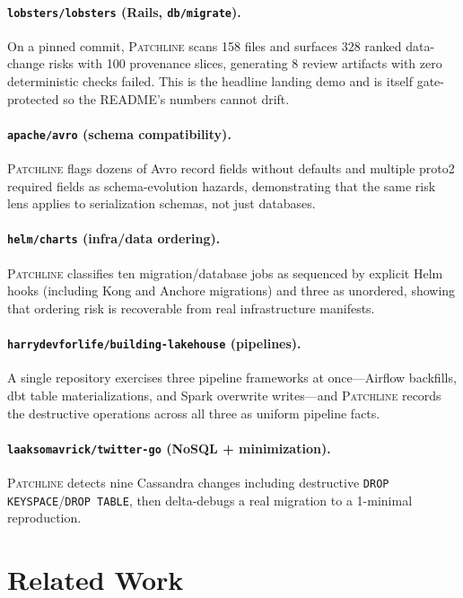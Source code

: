 \documentclass[11pt]{article}
\newcommand{\tool}{\textsc{Patchline}}
\newcommand{\code}[1]{\texttt{#1}}
\begin{document}
\paragraph{\code{lobsters/lobsters} (Rails, \code{db/migrate}).} On a pinned commit, \tool{} scans 158
files and surfaces 328 ranked data-change risks with 100 provenance slices, generating 8 review
artifacts with zero deterministic checks failed. This is the headline landing demo and is itself
gate-protected so the README's numbers cannot drift.

\paragraph{\code{apache/avro} (schema compatibility).} \tool{} flags dozens of Avro record fields
without defaults and multiple proto2 required fields as schema-evolution hazards, demonstrating that
the same risk lens applies to serialization schemas, not just databases.

\paragraph{\code{helm/charts} (infra/data ordering).} \tool{} classifies ten migration/database jobs
as sequenced by explicit Helm hooks (including Kong and Anchore migrations) and three as unordered,
showing that ordering risk is recoverable from real infrastructure manifests.

\paragraph{\code{harrydevforlife/building-lakehouse} (pipelines).} A single repository exercises three
pipeline frameworks at once---Airflow backfills, dbt table materializations, and Spark overwrite
writes---and \tool{} records the destructive operations across all three as uniform pipeline facts.

\paragraph{\code{laaksomavrick/twitter-go} (NoSQL + minimization).} \tool{} detects nine Cassandra
changes including destructive \code{DROP KEYSPACE}/\code{DROP TABLE}, then delta-debugs a real
migration to a 1-minimal reproduction.

\section{Related Work}
\end{document}
